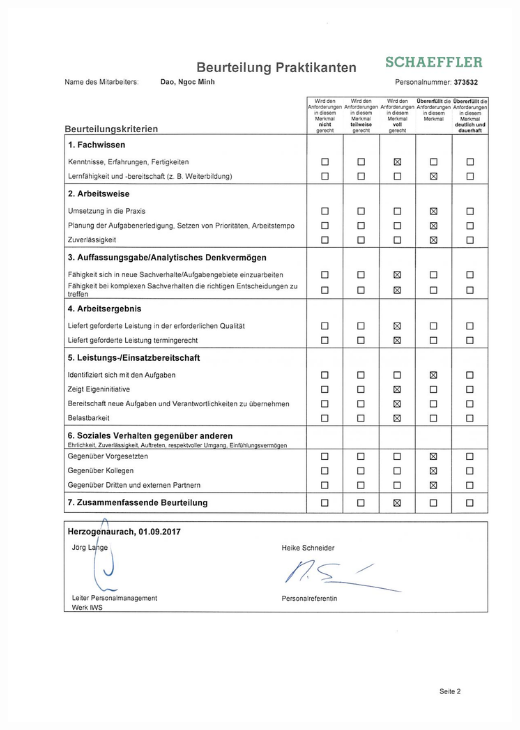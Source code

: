 \documentclass[12pt,a4paper]{scrartcl}
\begin{document}
\includegraphics[width=\linewidth, keepaspectratio]{./zeugnisse/praktikumzeugnis_2.jpg}

\newpage
{}


\end{document}
